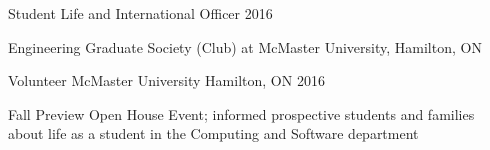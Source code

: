 \begin{cventries}
  \cventry
{Student Life and International Officer} %
{} %
{} %
{\vspace{-4.0mm} 2016} %
{\vspace{-1em}\begin{cvitems}
		\item
		{Engineering Graduate Society (Club) at McMaster University, Hamilton, ON}
	\end{cvitems}
}

  \cventry
{Volunteer} %
{McMaster University} %
{Hamilton, ON} %
{2016} %
{\begin{cvitems}
		\item
		{Fall Preview Open House Event; informed prospective students and families about life as a student in the Computing and Software department}
	\end{cvitems}
}




\end{cventries}
